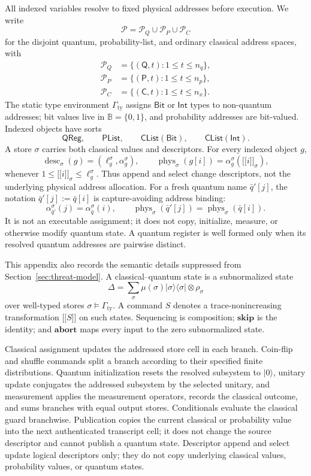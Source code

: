 \documentclass[conference,compsoc]{IEEEtran}
\providecommand{\llbracket}{\mathopen{[\![}}
\providecommand{\rrbracket}{\mathclose{]\!]}}
\begin{document}
All indexed variables resolve to fixed physical addresses before execution. We write
\[
\mathcal P=\mathcal P_Q\cup\mathcal P_P\cup\mathcal P_C
\]
for the disjoint quantum, probability-list, and ordinary classical address spaces, with
\[
\begin{aligned}
\mathcal P_Q&=\{(\mathsf Q,t):1\le t\le n_q\},\\
\mathcal P_P&=\{(\mathsf P,t):1\le t\le n_p\},\\
\mathcal P_C&=\{(\mathsf C,t):1\le t\le n_x\}.
\end{aligned}
\]
The static type environment \(\Gamma_{\mathrm{ty}}\) assigns \(\mathsf{Bit}\)
or \(\mathsf{Int}\) types to non-quantum addresses; bit values live in
\(\mathbb B=\{0,1\}\), and probability addresses are bit-valued. Indexed
objects have sorts
\[
\mathsf{QReg},\qquad \mathsf{PList},\qquad
\mathsf{CList}(\mathsf{Bit}),\qquad \mathsf{CList}(\mathsf{Int}).
\]
A store \(\sigma\) carries both classical values and descriptors. For every indexed object \(g\),
\[
\operatorname{desc}_{\sigma}(g)=(\ell_g^\sigma,\alpha_g^\sigma),
\qquad
\operatorname{phys}_{\sigma}(g[i])
=\alpha_g^\sigma(\llbracket i\rrbracket_\sigma),
\]
whenever \(1\le\llbracket i\rrbracket_\sigma\le\ell_g^\sigma\). Thus append
and select change descriptors, not the underlying physical address allocation.
For a fresh quantum name \(\bar q'[j]\), the notation
\(\bar q'[j]:=\bar q[i]\) is capture-avoiding address binding:
\[
\alpha_{\bar q'}^\sigma(j)=\alpha_{\bar q}^\sigma(i),
\qquad
\operatorname{phys}_{\sigma}(\bar q'[j])
=\operatorname{phys}_{\sigma}(\bar q[i]).
\]
It is not an executable assignment; it does not copy, initialize, measure, or
otherwise modify quantum state. A quantum register is well formed only when its
resolved quantum addresses are pairwise distinct.

This appendix also records the semantic details suppressed from
Section~\ref{sec:threat-model}. A classical--quantum state is a subnormalized
state
\[
\Delta=\sum_{\sigma}\mu(\sigma)
|\sigma\rangle\!\langle\sigma|\otimes\rho_\sigma
\]
over well-typed stores \(\sigma\models\Gamma_{\mathrm{ty}}\). A command
\(S\) denotes a trace-nonincreasing transformation
\(\llbracket S\rrbracket\) on such states. Sequencing is composition;
\(\mathbf{skip}\) is the identity; and \(\mathbf{abort}\) maps every input to
the zero subnormalized state.

Classical assignment updates the addressed store cell in each branch.
Coin-flip and shuffle commands split a branch according to their specified
finite distributions. Quantum initialization resets the resolved subsystem to
\(|0\rangle\), unitary update conjugates the addressed subsystem by the
selected unitary, and measurement applies the measurement operators,
records the classical outcome, and sums branches with equal output stores.
Conditionals evaluate the classical guard branchwise. Publication copies the
current classical or probability value into the next authenticated transcript
cell; it does not change the source descriptor and cannot publish a quantum
state. Descriptor append and select update logical descriptors only; they do
not copy underlying classical values, probability values, or quantum states.
\end{document}
